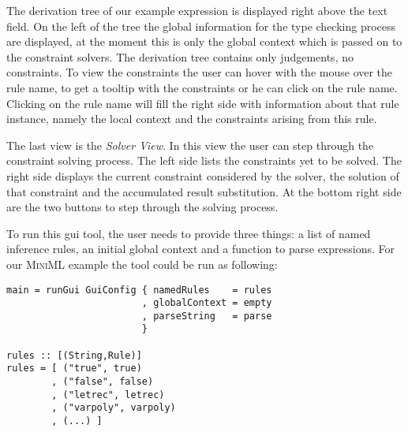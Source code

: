 The derivation tree of our example expression is displayed right above
the text field. On the left of the tree the global information for the
type checking process are displayed, at the moment this is only the
global context which is passed on to the constraint solvers. The
derivation tree contains only judgements, no constraints. To view the
constraints the user can hover with the mouse over the rule name, to
get a tooltip with the constraints or he can click on the rule
name. Clicking on the rule name will fill the right side with
information about that rule instance, namely the local context and the
constraints arising from this rule.



The last view is the \textit{Solver View}. In this view the user can
step through the constraint solving process.  The left side lists the
constraints yet to be solved. The right side displays the current
constraint considered by the solver, the solution of that constraint
and the accumulated result substitution. At the bottom right side are
the two buttons to step through the solving process.

\bigskip

To run this gui tool, the user needs to provide three things: a list
of named inference rules, an initial global context and a function to
parse expressions. For our \textsc{MiniML} example the tool could be
run as following:

\begin{lstlisting}
main = runGui GuiConfig { namedRules    = rules
                        , globalContext = empty
                        , parseString   = parse
                        }

rules :: [(String,Rule)]
rules = [ ("true", true)
        , ("false", false)
        , ("letrec", letrec)
        , ("varpoly", varpoly)
        , (...) ]
\end{lstlisting}
